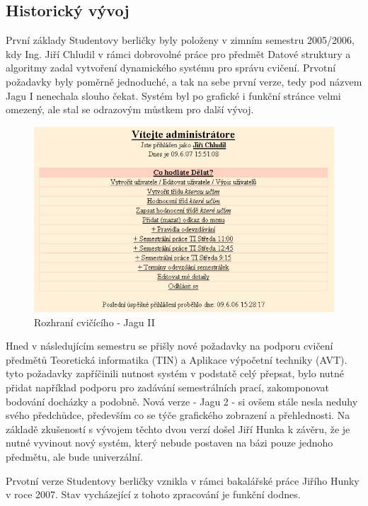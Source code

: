 \documentclass[11pt,twoside,a4paper]{book}
\begin{document}
\subsection{Historický vývoj}
První základy Studentovy berličky byly položeny v zimním semestru 2005/2006, kdy Ing. Jiří Chludil v rámci dobrovolné práce pro předmět Datové struktury a algoritmy zadal vytvoření dynamického systému pro správu cvičení. Prvotní požadavky byly poměrně jednoduché, a tak na sebe první verze, tedy pod názvem Jagu I nenechala slouho čekat. Systém byl po grafické i funkční stránce velmi omezený, ale stal se odrazovým můstkem pro další vývoj.
\begin{figure}[h]
\begin{center}
\includegraphics[width=15cm]{figures/jaguI.png}
\caption{Rozhraní cvičícího - Jagu II}
\label{fig:jaguI}
\end{center}
\end{figure}

Hned v následujícím semestru se přišly nové požadavky na podporu cvičení předmětů Teoretická informatika (TIN) a Aplikace výpočetní techniky (AVT). tyto požadavky zapříčinili nutnost systém v podstatě celý přepsat, bylo nutné přidat například podporu pro zadávání semestrálních prací, zakomponovat bodování docházky a podobně. Nová verze - Jagu 2 - si ovšem stále nesla neduhy svého předchůdce, především co se týče grafického zobrazení a přehlednosti. Na základě zkušeností s vývojem těchto dvou verzí došel Jiří Hunka k závěru, že je nutné vyvinout nový systém, který nebude postaven na bázi pouze jednoho předmětu, ale bude univerzální.

Prvotní verze Studentovy berličky vznikla v rámci bakalářské práce Jiřího Hunky v roce 2007. Stav vycházející z tohoto zpracování je funkční dodnes.
\end{document}
